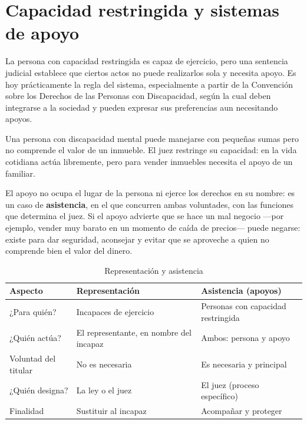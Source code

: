 \documentclass[12pt,oneside]{book}
\begin{document}
\section{Capacidad restringida y sistemas de apoyo}

La persona con capacidad restringida es capaz de ejercicio, pero una sentencia judicial establece que ciertos actos no puede realizarlos sola y necesita apoyo. Es hoy prácticamente la regla del sistema, especialmente a partir de la Convención sobre los Derechos de las Personas con Discapacidad, según la cual deben integrarse a la sociedad y pueden expresar sus preferencias aun necesitando apoyos.

\begin{ejemplo}
Una persona con discapacidad mental puede manejarse con pequeñas sumas pero no comprende el valor de un inmueble. El juez restringe su capacidad: en la vida cotidiana actúa libremente, pero para vender inmuebles necesita el apoyo de un familiar.
\end{ejemplo}

El apoyo no ocupa el lugar de la persona ni ejerce los derechos en su nombre: es un caso de \textbf{asistencia}, en el que concurren ambas voluntades, con las funciones que determina el juez. Si el apoyo advierte que se hace un mal negocio ---por ejemplo, vender muy barato en un momento de caída de precios--- puede negarse: existe para dar seguridad, aconsejar y evitar que se aproveche a quien no comprende bien el valor del dinero.

\begin{table}[H]
\centering
\begin{tabularx}{\textwidth}{B{0.22\textwidth} Y Y}
\toprule
\textbf{Aspecto} & \textbf{Representación} & \textbf{Asistencia (apoyos)} \\
\midrule
¿Para quién? & Incapaces de ejercicio & Personas con capacidad restringida \\
¿Quién actúa? & El representante, en nombre del incapaz & Ambos: persona y apoyo \\
Voluntad del titular & No es necesaria & Es necesaria y principal \\
¿Quién designa? & La ley o el juez & El juez (proceso específico) \\
Finalidad & Sustituir al incapaz & Acompañar y proteger \\
\bottomrule
\end{tabularx}
\caption{Representación y asistencia}
\end{table}
\end{document}
